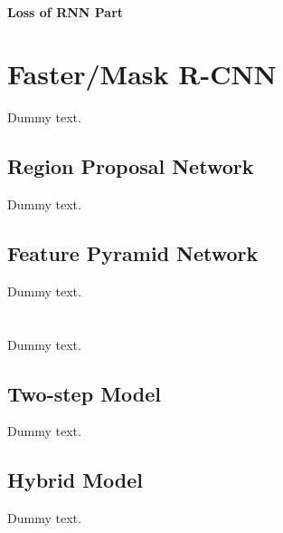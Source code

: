 \paragraph{Loss of RNN Part}





\section{Faster/Mask R-CNN}\label{modrcnn}

Dummy text.

\subsection{Region Proposal Network}\label{modrpn}

Dummy text.

\subsection{Feature Pyramid Network}\label{modfpn}

Dummy text.

\section{\modelnameshort}\label{modmer}

Dummy text.

\subsection{Two-step Model}

Dummy text.

\subsection{Hybrid Model}

Dummy text.
